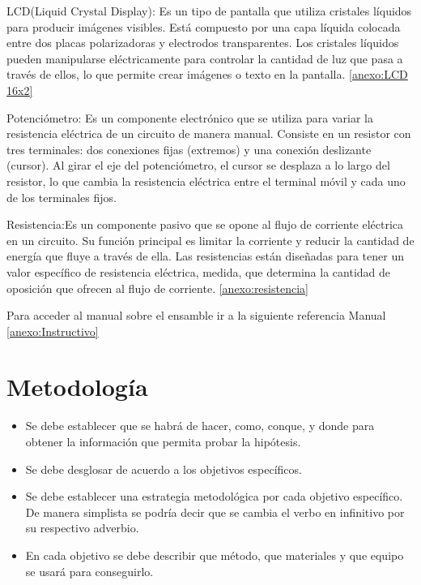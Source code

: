     LCD(Liquid Crystal Display): Es un tipo de pantalla que utiliza cristales líquidos para producir imágenes visibles. Está compuesto por una capa líquida colocada entre dos placas polarizadoras y electrodos transparentes. Los cristales líquidos pueden manipularse eléctricamente para controlar la cantidad de luz que pasa a través de ellos, lo que permite crear imágenes o texto en la pantalla.
    \ref{anexo:LCD 16x2}
    
    Potenciómetro:  Es un componente electrónico que se utiliza para variar la resistencia eléctrica de un circuito de manera manual. Consiste en un resistor con tres terminales: dos conexiones fijas (extremos) y una conexión deslizante (cursor). Al girar el eje del potenciómetro, el cursor se desplaza a lo largo del resistor, lo que cambia la resistencia eléctrica entre el terminal móvil y cada uno de los terminales fijos.
    
     Resistencia:Es un componente pasivo que se opone al flujo de corriente eléctrica en un circuito. Su función principal es limitar la corriente y reducir la cantidad de energía que fluye a través de ella. Las resistencias están diseñadas para tener un valor específico de resistencia eléctrica, medida, que determina la cantidad de oposición que ofrecen al flujo de corriente.
    \ref{anexo:resistencia}
    
    Para acceder al manual sobre el ensamble ir a la siguiente referencia
    Manual \ref{anexo:Instructivo}
    
    \section{Metodología}
    
    \begin{itemize}
        \item Se debe establecer que se habrá de hacer, como, conque, y donde para obtener la información que permita probar la hipótesis.  
        \item Se debe desglosar de acuerdo a los objetivos específicos. 
        \item Se debe establecer una estrategia metodológica por cada objetivo específico. De manera simplista se podría decir que se cambia el verbo en infinitivo por su respectivo adverbio.
        \item En cada objetivo se debe describir que método, que materiales y que equipo se usará para conseguirlo.
    \end{itemize}
    
